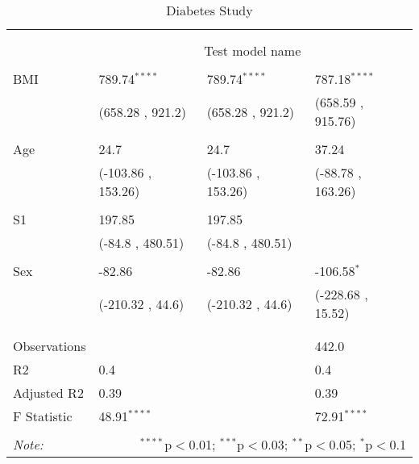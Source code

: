 \begin{table}[!htbp] \centering
  \caption{Diabetes Study}
  \label{}
\begin{tabularx}{\textwidth}{lXXX}
\\[-1.8ex]\hline
\hline \\[-1.8ex]
&\multicolumn{3}{c}{\textit{}} \
\cr \cline{4-4}
\\[-1.8ex]&\multicolumn{3}{c}{Test model name} \\\hline \\[-1.8ex]
 BMI & 789.74$^{****}$ & 789.74$^{****}$ & 787.18$^{****}$ \\
&(658.28 , 921.2)&(658.28 , 921.2)&(658.59 , 915.76)\\
  & & & \\
 Age & 24.7$^{}$ & 24.7$^{}$ & 37.24$^{}$ \\
&(-103.86 , 153.26)&(-103.86 , 153.26)&(-88.78 , 163.26)\\
  & & & \\
 S1 & 197.85$^{}$ & 197.85$^{}$ & \\
&(-84.8 , 480.51)&(-84.8 , 480.51)& \\
  & & & \\
 Sex & -82.86$^{}$ & -82.86$^{}$ & -106.58$^{*}$ \\
&(-210.32 , 44.6)&(-210.32 , 44.6)&(-228.68 , 15.52)\\
  & & & \\
\hline \\[-1.8ex]
 Observations\quad\quad &   &   & 442.0 \\
 R${2}$\quad\quad & 0.4 &   & 0.4 \\
 Adjusted R${2}$\quad\quad& 0.39 &   & 0.39 \\
 F Statistic\quad\quad & 48.91$^{****}$  &     & 72.91$^{****}$  \\
\hline
\hline \\[-1.8ex]
\textit{Note:} & \multicolumn{3}{r}{$^{****}$p$<$0.01; $^{***}$p$<$0.03; $^{**}$p$<$0.05; $^{*}$p$<$0.1} \\
\end{tabularx}
\end{table}